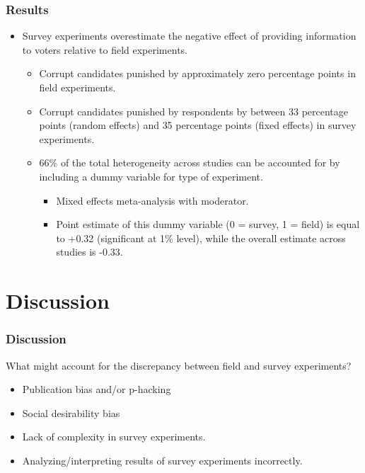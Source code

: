 \documentclass[usenames,dvipsnames]{beamer}
\begin{document}

\begin{frame}
\frametitle{Results}
\begin{itemize}
\item Survey experiments overestimate the negative effect of providing information to voters relative to field experiments.
\pause
\begin{itemize}
\item Corrupt candidates punished by approximately \textcolor{Cerulean}{zero percentage points} in field experiments.
\pause
\item Corrupt candidates punished by respondents by between \textcolor{Cerulean}{33 percentage points} (random effects) and \textcolor{Cerulean}{35 percentage points} (fixed effects) in survey experiments.
\pause
\item 66\% of the total heterogeneity across studies can be accounted for by including a dummy variable for type of experiment.
\begin{itemize}
\item Mixed effects meta-analysis with moderator. 
\pause
\item Point estimate of this dummy variable (0 = survey, 1 = field) is equal to +0.32 (significant at 1\% level), while the overall estimate across studies is -0.33. 
\end{itemize}
\end{itemize}
\end{itemize}
\end{frame}

\section{Discussion}

\begin{frame}
\frametitle{Discussion}
What might account for the discrepancy between field and survey experiments?
\pause
\begin{itemize}
\item Publication bias and/or p-hacking
\pause
\item Social desirability bias
\pause
\item Lack of complexity in survey experiments.
\pause
\item Analyzing/interpreting results of survey experiments incorrectly. 
\end{itemize}

\end{frame}
\end{document}
